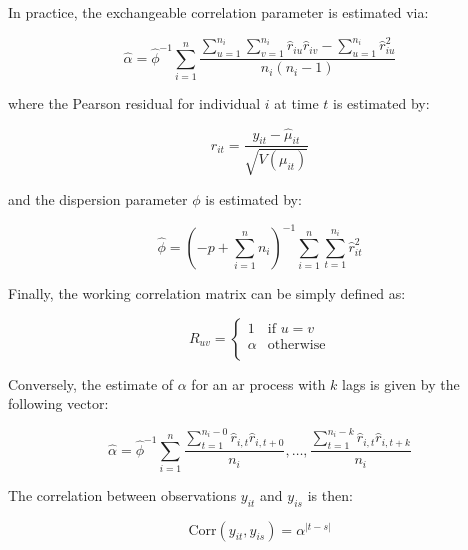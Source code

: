 \documentclass{report}
\begin{document}
In practice, the exchangeable correlation parameter is estimated via:

\begin{equation}\label{eq:glm-gee-alpha-exchangeable}
    \hat{\alpha} = \hat{\phi}^{-1}\sum_{i=1}^n \frac{\sum_{u=1}^{n_i}\sum_{v=1}^{n_i} \hat{r}_{iu}\hat{r}_{iv} - \sum_{u=1}^{n_i} \hat{r}^2_{iu}}{n_i(n_i-1)}
\end{equation}

where the Pearson residual for individual $i$ at time $t$ is estimated by:

\begin{equation}\label{eq:glm-gee-pearson-residual}
    \hat{r}_{it} = \frac{y_{it} - \hat{\mu}_{it}}{\sqrt{V(\mu_{it})}}
\end{equation}

and the dispersion parameter $\phi$ is estimated by:

\begin{equation}\label{eq:glm-gee-phi-hat}
    \hat{\phi} = \left(-p + \sum_{i=1}^n n_i\right)^{-1} \sum_{i=1}^n \sum_{t=1}^{n_i} \hat{r}^2_{it}
\end{equation}

Finally, the working correlation matrix can be simply defined as:

\begin{equation}\label{eq:glm-gee-R-alpha-exchangeable}
    R_{uv} = \begin{cases}
        1 & \text{if } u = v \\
        \alpha & \text{otherwise} \\
    \end{cases}
\end{equation}

Conversely, the estimate of $\alpha$ for an \gls{ar} process with $k$ lags is given by the following vector:

\begin{equation}\label{eq:glm-gee-alpha-ar-1}
    \hat{\alpha} = \hat{\phi}^{-1} \sum_{i=1}^n \frac{\sum_{t=1}^{n_i-0}\hat{r}_{i,t}\hat{r}_{i,t+0}}{n_i}, \dots, \frac{\sum_{t=1}^{n_i-k}\hat{r}_{i,t}\hat{r}_{i,t+k}}{n_i}
\end{equation}

The correlation between observations $y_{it}$ and $y_{is}$ is then:

\begin{equation}\label{eq:glm-gee-alpha-ar-2}
    \text{Corr}(y_{it}, y_{is}) = \alpha^{|t-s|}
\end{equation}
\end{document}
